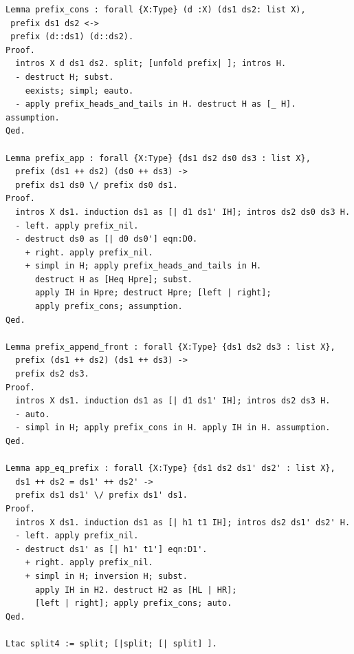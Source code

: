 \documentclass[12pt]{report}
\begin{document}
\begin{verbatim}
Lemma prefix_cons : forall {X:Type} (d :X) (ds1 ds2: list X),
 prefix ds1 ds2 <->
 prefix (d::ds1) (d::ds2).
Proof.
  intros X d ds1 ds2. split; [unfold prefix| ]; intros H.
  - destruct H; subst.
    eexists; simpl; eauto.
  - apply prefix_heads_and_tails in H. destruct H as [_ H]. assumption.
Qed.

Lemma prefix_app : forall {X:Type} {ds1 ds2 ds0 ds3 : list X},
  prefix (ds1 ++ ds2) (ds0 ++ ds3) ->
  prefix ds1 ds0 \/ prefix ds0 ds1.
Proof.
  intros X ds1. induction ds1 as [| d1 ds1' IH]; intros ds2 ds0 ds3 H.
  - left. apply prefix_nil.
  - destruct ds0 as [| d0 ds0'] eqn:D0.
    + right. apply prefix_nil.
    + simpl in H; apply prefix_heads_and_tails in H.
      destruct H as [Heq Hpre]; subst.
      apply IH in Hpre; destruct Hpre; [left | right];
      apply prefix_cons; assumption.
Qed.

Lemma prefix_append_front : forall {X:Type} {ds1 ds2 ds3 : list X},
  prefix (ds1 ++ ds2) (ds1 ++ ds3) ->
  prefix ds2 ds3.
Proof.
  intros X ds1. induction ds1 as [| d1 ds1' IH]; intros ds2 ds3 H.
  - auto.
  - simpl in H; apply prefix_cons in H. apply IH in H. assumption.
Qed.

Lemma app_eq_prefix : forall {X:Type} {ds1 ds2 ds1' ds2' : list X},
  ds1 ++ ds2 = ds1' ++ ds2' ->
  prefix ds1 ds1' \/ prefix ds1' ds1.
Proof.
  intros X ds1. induction ds1 as [| h1 t1 IH]; intros ds2 ds1' ds2' H.
  - left. apply prefix_nil.
  - destruct ds1' as [| h1' t1'] eqn:D1'.
    + right. apply prefix_nil.
    + simpl in H; inversion H; subst.
      apply IH in H2. destruct H2 as [HL | HR];
      [left | right]; apply prefix_cons; auto.
Qed.

Ltac split4 := split; [|split; [| split] ].


\end{verbatim}
\end{document}
